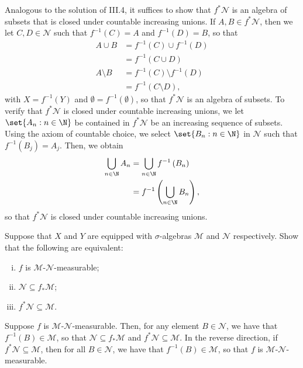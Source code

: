 \documentclass[10pt]{mypackage}
\begin{document}
\begin{solution}
  Analogous to the solution of III.4, it suffices to show that $f^{\ast}\mathcal{N}$ is an algebra of subsets that is closed under countable increasing unions. If $A,B\in f^{\ast}\mathcal{N}$, then we let $C,D\in \mathcal{N}$ such that $f^{-1}\left( C \right) = A$ and $f^{-1}\left( D \right) = B$, so that
  \begin{align*}
    A\cup B &= f^{-1}\left( C \right)\cup f^{-1}\left( D \right)\\
            &= f^{-1}\left( C\cup D \right)\\
    A\setminus B &= f^{-1}\left( C \right)\setminus f^{-1}\left( D \right)\\
                 &= f^{-1}\left( C\setminus D \right),
  \end{align*}
  with $X = f^{-1}\left( Y \right)$ and $\emptyset = f^{-1}\left( \emptyset \right)$, so that $f^{\ast}\mathcal{N}$ is an algebra of subsets. To verify that $f^{\ast}\mathcal{N}$ is closed under countable increasing unions, we let $\set{A_n : n\in \N}$ be contained in $f^{\ast}\mathcal{N}$ be an increasing sequence of subsets. Using the axiom of countable choice, we select $\set{B_n : n\in \N}$ in $\mathcal{N}$ such that $f^{-1}\left( B_j \right) = A_j$. Then, we obtain
  \begin{align*}
    \bigcup_{n\in \N}A_n &= \bigcup_{n\in \N}f^{-1}\left( B_n \right)\\
                         &= f^{-1}\left( \bigcup_{n\in \N}B_n \right),
  \end{align*}
  so that $f^{\ast}\mathcal{N}$ is closed under countable increasing unions.
\end{solution}
\begin{problem}
  Suppose that $X$ and $Y$ are equipped with $\sigma$-algebras $\mathcal{M}$ and $\mathcal{N}$ respectively. Show that the following are equivalent:
  \begin{enumerate}[(i)]
    \item $f$ is $\mathcal{M}$-$\mathcal{N}$-measurable;
    \item $\mathcal{N}\subseteq f_{\ast}\mathcal{M}$;
    \item $f^{\ast}\mathcal{N}\subseteq \mathcal{M}$.
  \end{enumerate}
\end{problem}
\begin{solution}
  Suppose $f$ is $\mathcal{M}$-$\mathcal{N}$-measurable. Then, for any element $B\in \mathcal{N}$, we have that $f^{-1}\left( B \right)\in \mathcal{M}$, so that $\mathcal{N}\subseteq f_{\ast}\mathcal{M}$ and $f^{\ast}\mathcal{N}\subseteq \mathcal{M}$. In the reverse direction, if $f^{\ast}\mathcal{N}\subseteq \mathcal{M}$, then for all $B\in \mathcal{N}$, we have that $f^{-1}\left( B \right)\in \mathcal{M}$, so that $f$ is $\mathcal{M}$-$\mathcal{N}$-measurable.
\end{solution}
\end{document}
